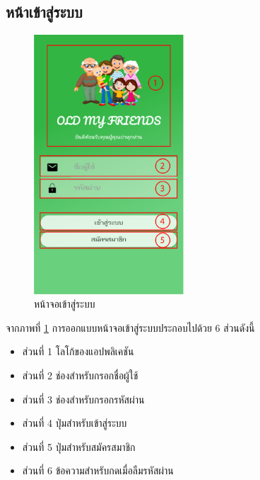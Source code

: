 	\subsection{หน้าเข้าสู่ระบบ}
		\begin{figure}[H]
			\centering
			\includegraphics[width=0.5\textwidth]{Figures/3/UI/login}
			\caption{หน้าจอเข้าสู่ระบบ}
			\label{Fig:หน้าจอเข้าสู่ระบบ}
		\end{figure}
		จากภาพที่ \ref{Fig:หน้าจอเข้าสู่ระบบ} การออกแบบหน้าจอเข้าสู่ระบบประกอบไปด้วย 6 ส่วนดังนี้
		\begin{itemize}
			\item ส่วนที่ 1 โลโก้ของแอปพลิเคชัน
			\item ส่วนที่ 2 ช่องสำหรับกรอกชื่อผู้ใช้
			\item ส่วนที่ 3 ช่องสำหรับกรอกรหัสผ่าน
			\item ส่วนที่ 4 ปุ่มสำหรับเข้าสู่ระบบ
			\item ส่วนที่ 5 ปุ่มสำหรับสมัครสมาชิก
			\item ส่วนที่ 6 ข้อความสำหรับกดเมื่อลืมรหัสผ่าน
		\end{itemize}

